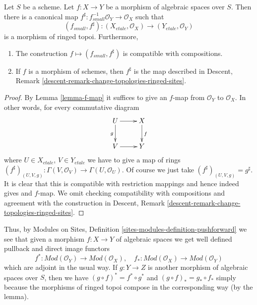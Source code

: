 \begin{lemma}
\label{lemma-morphism-ringed-topoi}
Let $S$ be a scheme.
Let $f : X \to Y$ be a morphism of algebraic spaces over $S$.
Then there is a canonical map
$f^\sharp : f_{small}^{-1}\mathcal{O}_Y \to \mathcal{O}_X$ such that
$$
(f_{small}, f^\sharp) :
(X_{etale}, \mathcal{O}_X)
\to
(Y_{etale}, \mathcal{O}_Y)
$$
is a morphism of ringed topoi. Furthermore,
\begin{enumerate}
\item The construction $f \mapsto (f_{small}, f^\sharp)$ is compatible with
compositions.
\item If $f$ is a morphism of schemes, then $f^\sharp$ is the map described in
Descent, Remark \ref{descent-remark-change-topologies-ringed-sites}.
\end{enumerate}
\end{lemma}

\begin{proof}
By Lemma \ref{lemma-f-map} it suffices to give an $f$-map from
$\mathcal{O}_Y$ to $\mathcal{O}_X$. In other words, for every
commutative diagram
$$
\xymatrix{
U \ar[d]_g \ar[r] & X \ar[d]^f \\
V \ar[r] & Y
}
$$
where $U \in X_{etale}$, $V \in Y_{etale}$ we have to give a map of
rings
$
(f^\sharp)_{(U, V, g)} :
\Gamma(V, \mathcal{O}_V)
\to
\Gamma(U, \mathcal{O}_U).
$
Of course we just take $(f^\sharp)_{(U, V, g)} = g^\sharp$.
It is clear that this is compatible with restriction mappings
and hence indeed gives and $f$-map.
We omit checking compatibility with compositions and agreement with the
construction in
Descent, Remark \ref{descent-remark-change-topologies-ringed-sites}.
\end{proof}

\noindent
Thus, by
Modules on Sites, Definition \ref{sites-modules-definition-pushforward}
we see that given a morphism $f : X \to Y$ of algebraic spaces
we get well defined pullback and direct image functors
\begin{equation}
\label{equation-push-pull}
f^* :
\textit{Mod}(\mathcal{O}_Y)
\longrightarrow
\textit{Mod}(\mathcal{O}_X), \quad
f_* :
\textit{Mod}(\mathcal{O}_X)
\longrightarrow
\textit{Mod}(\mathcal{O}_Y)
\end{equation}
which are adjoint in the usual way. If $g : Y \to Z$ is another morphism
of algebraic spaces over $S$, then we have
$(g \circ f)^* = f^* \circ g^*$ and $(g \circ f)_* = g_* \circ f_*$
simply because the morphisms of ringed topoi compose in the corresponding
way (by the lemma).


